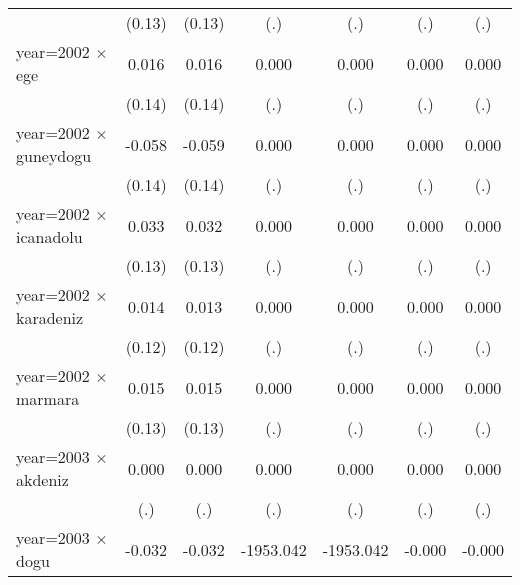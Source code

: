 {\begin{tabular}{l*{6}{c}}
                    &      (0.13)         &      (0.13)         &         (.)         &         (.)         &         (.)         &         (.)         \\
year=2002 $\times$ ege&       0.016         &       0.016         &       0.000         &       0.000         &       0.000         &       0.000         \\
                    &      (0.14)         &      (0.14)         &         (.)         &         (.)         &         (.)         &         (.)         \\
year=2002 $\times$ guneydogu&      -0.058         &      -0.059         &       0.000         &       0.000         &       0.000         &       0.000         \\
                    &      (0.14)         &      (0.14)         &         (.)         &         (.)         &         (.)         &         (.)         \\
year=2002 $\times$ icanadolu&       0.033         &       0.032         &       0.000         &       0.000         &       0.000         &       0.000         \\
                    &      (0.13)         &      (0.13)         &         (.)         &         (.)         &         (.)         &         (.)         \\
year=2002 $\times$ karadeniz&       0.014         &       0.013         &       0.000         &       0.000         &       0.000         &       0.000         \\
                    &      (0.12)         &      (0.12)         &         (.)         &         (.)         &         (.)         &         (.)         \\
year=2002 $\times$ marmara&       0.015         &       0.015         &       0.000         &       0.000         &       0.000         &       0.000         \\
                    &      (0.13)         &      (0.13)         &         (.)         &         (.)         &         (.)         &         (.)         \\
year=2003 $\times$ akdeniz&       0.000         &       0.000         &       0.000         &       0.000         &       0.000         &       0.000         \\
                    &         (.)         &         (.)         &         (.)         &         (.)         &         (.)         &         (.)         \\
year=2003 $\times$ dogu&      -0.032         &      -0.032         &   -1953.042         &   -1953.042         &      -0.000         &      -0.000         \\

\end{tabular}}
